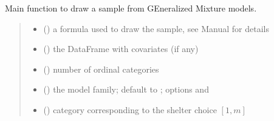 \documentclass[letterpaper,10pt,english]{sphinxmanual}
\begin{document}
\begin{fulllineitems}
\label{\detokenize{cubmods:cubmods.gem.draw}}
\pysigstartsignatures
{}
\pysigstopsignatures
\sphinxAtStartPar
Main function to draw a sample from GEneralized Mixture models.
\begin{quote}\begin{description}
\begin{itemize}
\item {} 
\sphinxAtStartPar
{} () \textendash{} a formula used to draw the sample, see
Manual for details

\item {} 
\sphinxAtStartPar
{} () \textendash{} the DataFrame with covariates (if any)

\item {} 
\sphinxAtStartPar
{} () \textendash{} number of ordinal categories

\item {} 
\sphinxAtStartPar
{} () \textendash{} the model family; default to ; options  and 

\item {} 
\sphinxAtStartPar
{} () \textendash{} category corresponding to the shelter choice \([1,m]\)


\end{itemize}
\end{description}
\end{quote}
\end{fulllineitems}
\end{document}
